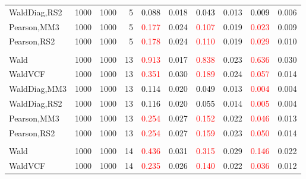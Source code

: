 \documentclass[
]{article}
\begin{document}
\begin{table}[H]
{\begin{tabular}[t]{lrrrrrrlrr}
\hspace{1em}WaldDiag,RS2 & 1000 & 1000 & 5 & \textcolor{black}{0.088} & 0.018 & \textcolor{black}{0.043} & 0.013 & \textcolor{black}{0.009} & 0.006\\
\hspace{1em}Pearson,MM3 & 1000 & 1000 & 5 & \textcolor{red}{0.177} & 0.024 & \textcolor{red}{0.107} & 0.019 & \textcolor{red}{0.023} & 0.009\\
\hspace{1em}Pearson,RS2 & 1000 & 1000 & 5 & \textcolor{red}{0.178} & 0.024 & \textcolor{red}{0.110} & 0.019 & \textcolor{red}{0.029} & 0.010\\
\addlinespace[0.3em]
\multicolumn{10}{l}{\textbf{1F 15V}}\\
\hspace{1em}Wald & 1000 & 1000 & 13 & \textcolor{red}{0.913} & 0.017 & \textcolor{red}{0.838} & 0.023 & \textcolor{red}{0.636} & 0.030\\
\hspace{1em}WaldVCF & 1000 & 1000 & 13 & \textcolor{red}{0.351} & 0.030 & \textcolor{red}{0.189} & 0.024 & \textcolor{red}{0.057} & 0.014\\
\hspace{1em}WaldDiag,MM3 & 1000 & 1000 & 13 & \textcolor{black}{0.114} & 0.020 & \textcolor{black}{0.049} & 0.013 & \textcolor{red}{0.004} & 0.004\\
\hspace{1em}WaldDiag,RS2 & 1000 & 1000 & 13 & \textcolor{black}{0.116} & 0.020 & \textcolor{black}{0.055} & 0.014 & \textcolor{red}{0.005} & 0.004\\
\hspace{1em}Pearson,MM3 & 1000 & 1000 & 13 & \textcolor{red}{0.254} & 0.027 & \textcolor{red}{0.152} & 0.022 & \textcolor{red}{0.046} & 0.013\\
\hspace{1em}Pearson,RS2 & 1000 & 1000 & 13 & \textcolor{red}{0.254} & 0.027 & \textcolor{red}{0.159} & 0.023 & \textcolor{red}{0.050} & 0.014\\
\addlinespace[0.3em]
\multicolumn{10}{l}{\textbf{2F 10V}}\\
\hspace{1em}Wald & 1000 & 1000 & 14 & \textcolor{red}{0.436} & 0.031 & \textcolor{red}{0.315} & 0.029 & \textcolor{red}{0.146} & 0.022\\
\hspace{1em}WaldVCF & 1000 & 1000 & 14 & \textcolor{red}{0.235} & 0.026 & \textcolor{red}{0.140} & 0.022 & \textcolor{red}{0.036} & 0.012\\

\end{tabular}}
\end{table}
\end{document}

